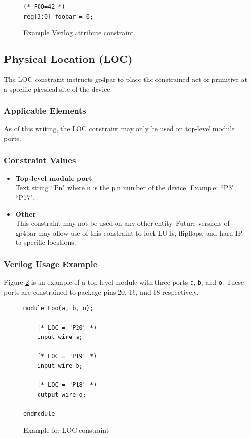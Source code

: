 \documentclass{article}
\begin{document}
\begin{figure}[h]
\begin{lstlisting}
(* FOO=42 *)
reg[3:0] foobar = 0;
\end{lstlisting}
\caption{Example Verilog attribute constraint}
\label{constraint}
\end{figure}


\pagebreak
\subsection{Physical Location (LOC)}

The LOC constraint instructs gp4par to place the constrained net or primitive at a specific physical site of the 
device.

\subsubsection{Applicable Elements}
As of this writing, the LOC constraint may only be used on top-level module ports. 

\subsubsection{Constraint Values}
\begin{itemize}
\item {\bfseries Top-level module port}\\
Text string ``Pn" where \texttt{n} is the pin number of the device. Example: ``P3", ``P17".
\item {\bfseries Other} \\
This constraint may not be used on any other entity. Future versions of gp4par may allow use of this constraint 
to lock LUTs, flipflops, and hard IP to specific locations.
\end{itemize}

\subsubsection{Verilog Usage Example}

Figure \ref{constraint-loc} is an example of a top-level module with three ports \texttt{a}, \texttt{b}, and \texttt{o}.
These ports are constrained to package pins 20, 19, and 18 respectively.

\begin{figure}[h]
\begin{lstlisting}
module Foo(a, b, o);

	(* LOC = "P20" *)
	input wire a;

	(* LOC = "P19" *)
	input wire b;

	(* LOC = "P18" *)
	output wire o;
	
endmodule
\end{lstlisting}
\caption{Example for LOC constraint}
\label{constraint-loc}
\end{figure}
\end{document}
